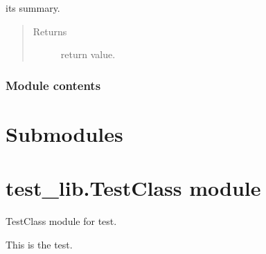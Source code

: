\documentclass[letterpaper,10pt,dvipdfmx]{sphinxmanual}
\begin{document}
\begin{fulllineitems}
\label{\detokenize{test_lib.b:test_lib.b.mod3.func_dummy}}
it\textquotesingle{}s summary.
\begin{quote}\begin{description}
\item[{Returns}] \leavevmode
return value.

\end{description}\end{quote}

\end{fulllineitems}



\subsubsection{Module contents}
\label{\detokenize{test_lib.b:module-test_lib.b}}\label{\detokenize{test_lib.b:module-contents}}

\section{Submodules}
\label{\detokenize{test_lib:submodules}}

\section{test\_lib.TestClass module}
\label{\detokenize{test_lib:module-test_lib.TestClass}}\label{\detokenize{test_lib:test-lib-testclass-module}}
TestClass module for test.

This is the test.
\end{document}
